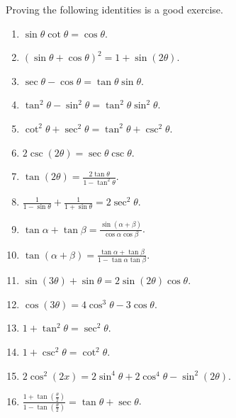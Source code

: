 \begin{frame}
Proving the following identities is a good exercise.
\begin{multicols}{2}
\begin{enumerate}
\item $\displaystyle \sin \theta\cot \theta =\cos \theta$.
\item $\displaystyle (\sin \theta +\cos \theta)^2=1+\sin(2\theta)$.
\item $\displaystyle \sec \theta - \cos \theta= \tan \theta \sin \theta$.
\item $\displaystyle \tan^2 \theta-\sin^2 \theta=\tan^2\theta\sin^2\theta$.
\item $\displaystyle \cot^2\theta+\sec^2\theta= \tan^2\theta+\csc^2\theta$.
\item $\displaystyle 2\csc (2\theta)= \sec \theta \csc \theta$.
\item $\displaystyle \tan (2\theta) =\frac{2\tan \theta}{1-\tan^2\theta} $.
\item $\displaystyle \frac{1}{1-\sin \theta}+ \frac{1}{1+\sin \theta}=2\sec^2\theta$.
\item $\displaystyle \tan \alpha + \tan \beta = \frac{\sin (\alpha+\beta)}{\cos \alpha \cos \beta}$.
\item $\displaystyle \tan (\alpha+\beta)= \frac{\tan \alpha +\tan \beta}{1-\tan \alpha\tan \beta}$.
\item $\displaystyle \sin (3\theta) +\sin \theta = 2 \sin (2\theta ) \cos \theta $.
\item $\displaystyle \cos (3\theta) = 4\cos^3\theta-3\cos \theta $.
\item $\displaystyle 1+\tan^2\theta = \sec^2\theta$.
\item $\displaystyle 1+\csc^2\theta = \cot^2\theta$.
\item $2\cos^2(2x)=2\sin^4 \theta +2\cos^4 \theta - \sin^2(2\theta)$.
\item $\displaystyle \frac{1+\tan \left(\frac{\theta}{2} \right) } {1 -\tan \left(\frac{\theta}{2}\right)}= \tan \theta +\sec \theta$.
\end{enumerate} 
\end{multicols}
\end{frame}